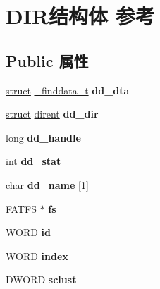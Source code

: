\hypertarget{struct_d_i_r}{}\section{D\+I\+R结构体 参考}
\label{struct_d_i_r}
\subsection*{Public 属性}
\begin{DoxyCompactItemize}
\item 
\mbox{\label{struct_d_i_r_a6231230d3a20b1aebefb0ce8388c14ea}} 
\hyperlink{interfacestruct}{struct} \hyperlink{struct__finddata__t}{\+\_\+finddata\+\_\+t} {\bfseries dd\+\_\+dta}
\item 
\mbox{\label{struct_d_i_r_a0f9e3c001963fe5a3f863bdae7596be4}} 
\hyperlink{interfacestruct}{struct} \hyperlink{structdirent}{dirent} {\bfseries dd\+\_\+dir}
\item 
\mbox{\label{struct_d_i_r_a84327de4db28c259d5fc522313aaa7e2}} 
long {\bfseries dd\+\_\+handle}
\item 
\mbox{\label{struct_d_i_r_a6186be7485a2b1f4fe802c4857e71786}} 
int {\bfseries dd\+\_\+stat}
\item 
\mbox{\label{struct_d_i_r_a9bd046693b16740589b43675aabc9571}} 
char {\bfseries dd\+\_\+name} \mbox{[}1\mbox{]}
\item 
\mbox{\label{struct_d_i_r_a312eaa66cb703fb2993ea98173dc0c9a}} 
\hyperlink{struct_f_a_t_f_s}{F\+A\+T\+FS} $\ast$ {\bfseries fs}
\item 
\mbox{\label{struct_d_i_r_aca2c95a99a04173917ec70c030891383}} 
W\+O\+RD {\bfseries id}
\item 
\mbox{\label{struct_d_i_r_ab95119fbacbe45e3e9ee0f962b844092}} 
W\+O\+RD {\bfseries index}
\item 
\mbox{\label{struct_d_i_r_a9212af5877b94d790dd3bab3aa320994}} 
D\+W\+O\+RD {\bfseries sclust}
\item 
\mbox{\label{struct_d_i_r_acfbb8ba2d6e73b6f999ceffd1857c190}} 

\end{DoxyCompactItemize}
